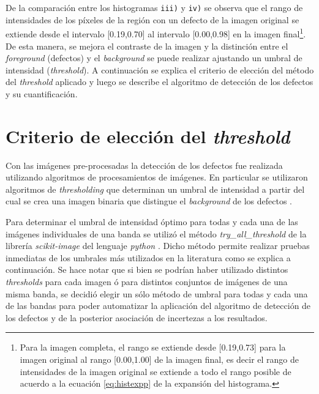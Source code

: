 De la comparación entre los histogramas \texttt{iii)} y \texttt{iv)} se observa que el rango de intensidades de los píxeles de la región con un defecto de la imagen original se extiende desde el intervalo [0.19,0.70] al intervalo [0.00,0.98] en la imagen final\footnote{Para la imagen completa, el rango se extiende desde [0.19,0.73] para la imagen original al rango [0.00,1.00] de la imagen final, es decir el rango de intensidades de la imagen original se extiende a todo el rango posible de acuerdo a la ecuación \ref{eq:histexpp} de la expansión del histograma.}. De esta manera, se mejora el contraste de la imagen y la distinción entre el \textit{foreground} (defectos) y el \textit{background} se puede realizar ajustando un umbral de intensidad  (\textit{threshold}). A continuación se explica el criterio de elección del método del \textit{threshold} aplicado y luego se describe el algoritmo de detección de los defectos y su cuantificación.
\singlespacing
\section{Criterio de elección del \textit{threshold} \href{https://github.com/jrr1984/defects_analysis/blob/master/try_all_thresholds.py}{\faGithub}}
\label{sec:tthresh}

\hspace{0.5cm}Con las imágenes pre-procesadas la detección de los defectos fue realizada utilizando algoritmos de procesamientos de imágenes. En particular se utilizaron algoritmos de \textit{thresholding} que determinan un umbral de intensidad a partir del cual se crea una imagen binaria que distingue el \textit{background} de los defectos \cite{shapi}.

Para determinar el umbral de intensidad óptimo para todas y cada una de las imágenes individuales de una banda se utilizó el método \textit{try\_all\_threshold} de la librería \textit{scikit-image} del lenguaje \textit{python} \cite{van2014scikit}. Dicho método permite realizar pruebas inmediatas de los umbrales más utilizados en la literatura como se explica a continuación. Se hace notar que si bien se podrían haber utilizado distintos \textit{thresholds} para cada imagen ó para distintos conjuntos de imágenes de una misma banda, se decidió elegir un sólo método de umbral para todas y cada una de las bandas para poder automatizar la aplicación del algoritmo de detección de los defectos y de la posterior asociación de incertezas a los resultados.

